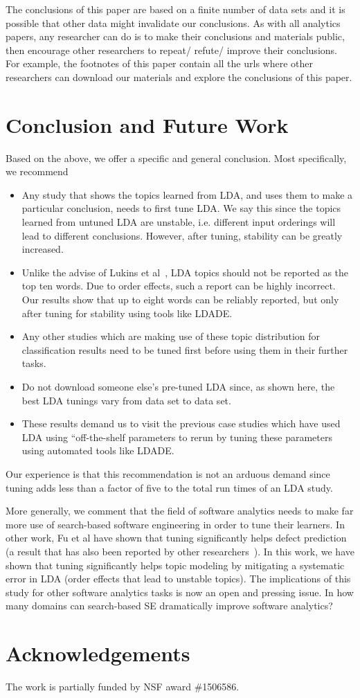 \documentclass[twocolumn,5p,sort&compress]{elsarticle}
\newcommand{\bi}{\begin{itemize}}
\newcommand{\ei}{\end{itemize}}
\theoremstyle{break}
\begin{document}
The conclusions of this paper are based on a finite number of data sets and it is possible
that other data might invalidate our conclusions. As with all analytics papers, any researcher can do is to make their conclusions and materials public, then encourage
other researchers to repeat/ refute/ improve their conclusions. For example, the footnotes of this paper contain all the urls where other researchers can download
our materials and explore the conclusions of this paper.

\section{Conclusion and Future Work}

Based on the above, we offer a specific and general conclusion. Most specifically, we recommend 
\bi

\item  
Any study that shows the topics learned from LDA, and uses them to make a particular
conclusion, needs to first tune LDA. We say this since the topics learned from untuned LDA are unstable, i.e. different input orderings will lead to different conclusions. However, after tuning, stability can be greatly increased.
\item Unlike the advise of Lukins et al~\cite{lukins2010bug}, LDA topics should not be reported as the top ten words.
  Due to order effects, such a report can be highly incorrect.
  Our results show that up to eight words can be reliably reported, but only
  after tuning for stability using tools like LDADE.
 \item Any other studies which are making use of these topic distribution for classification results need to be tuned first before using them in their further tasks.
\item Do not download someone else's pre-tuned LDA since, as shown here,  the best LDA tunings vary from data set to data set.
\item These results demand us to visit the previous case studies which have used LDA using ``off-the-shelf parameters to rerun by tuning these parameters using automated tools like LDADE.
    
\ei
Our experience is that this recommendation is not an arduous demand since tuning adds less than a factor of five to the total run times of an LDA study.

More generally, we comment that the field of software analytics needs to make far more use of search-based software engineering in order
to tune their learners. In other work, Fu et al have shown that tuning significantly helps defect prediction~\cite{fu2016tuning} (a result that has also been reported by
other researchers~\cite{panichella2013effectively}). In this work, we have shown that tuning significantly helps topic modeling by mitigating a systematic error in LDA  (order effects that lead to unstable topics). The implications of this study for other software analytics tasks is now an open
and pressing issue. 
In how many domains can search-based SE dramatically improve software analytics?


\section*{Acknowledgements}
		The work is partially funded by NSF award \#1506586.
	
\balance



\medskip

\end{document}
